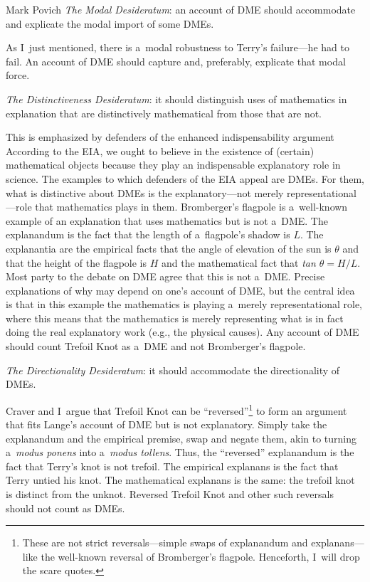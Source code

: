 \begin{artengenv}{Mark Povich}
\textit{The Modal Desideratum}: an account of DME should accommodate and explicate the modal import of some DMEs.
\parencite[][]{baron_explaining_2016}%


As I~just mentioned, there is a~modal robustness to Terry's failure---he had to fail. An account of DME should capture and, preferably, explicate that modal force.

\textit{The Distinctiveness Desideratum}: it should distinguish uses of mathematics in explanation that are distinctively mathematical from those that are not.
\parencite[][]{baron_explaining_2016}%


This is emphasized by defenders of the enhanced indispensability argument
\parencite[EIA, e.g.,][]{baker_mathematical_2009}
 According to the EIA, we ought to believe in the existence of (certain) mathematical objects because they play an indispensable explanatory role in science. The examples to which defenders of the EIA appeal are DMEs. For them, what is distinctive about DMEs is the explanatory---not merely representational---role that mathematics plays in them. Bromberger's 
\parencite*[][]{bromberger_why-questions_1966} %
 flagpole is a~well-known example of an explanation that uses mathematics but is not a~DME. The explanandum is the fact that the length of a~flagpole's shadow is $L$. The explanantia are the empirical facts that the angle of elevation of the sun is $\theta$ and that the height of the flagpole is $H$ and the mathematical fact that \textit{tan $\theta  = H/L$}. Most party to the debate on DME agree that this is not a~DME. Precise explanations of why may depend on one's account of DME, but the central idea is that in this example the mathematics is playing a~merely representational role, where this means that the mathematics is merely representing what is in fact doing the real explanatory work (e.g., the physical causes). Any account of DME should count Trefoil Knot as a~DME and not Bromberger's flagpole.

\textit{The Directionality Desideratum}: it should accommodate the directionality of DMEs.
\parencite[][]{craver_directionality_2017}%


Craver and I~argue that Trefoil Knot can be ``reversed''\footnote{These are not strict reversals---simple swaps of explanandum and explanans---like the well-known reversal of Bromberger's flagpole. Henceforth, I~will drop the scare quotes. } to form an argument that fits Lange's
\parencite*[][]{lange_what_2013} %
 account of DME but is not explanatory. Simply take the explanandum and the empirical premise, swap and negate them, akin to turning a~\textit{modus ponens} into a~\textit{modus tollens}. Thus, the ``reversed'' explanandum is the fact that Terry's knot is not trefoil. The empirical explanans is the fact that Terry untied his knot. The mathematical explanans is the same: the trefoil knot is distinct from the unknot. Reversed Trefoil Knot and other such reversals should not count as DMEs.


\end{artengenv}

